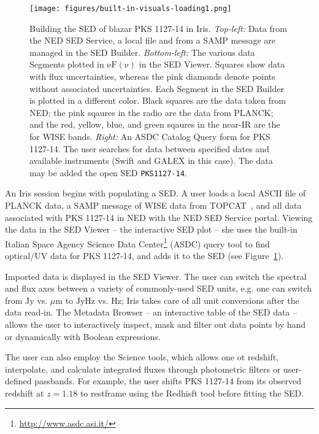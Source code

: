 \documentclass[5p]{elsarticle}
\begin{document}
\begin{figure}
\begin{center}
\texttt{[image: figures/built-in-visuals-loading1.png]}
\caption{\textbf{\textit{\label{fig:load_data}} } Building the SED of blazar PKS 1127-14 in Iris. \textit{Top-left:} Data from the NED SED Service, a local file and from a SAMP message are managed in the SED Builder. \textit{Bottom-left:} The various data Segments plotted in $\mathrm{\nu F \left( \nu \right)}$ in the SED Viewer. Squares show data with flux uncertainties, whereas the pink diamonds denote points without associated uncertainties. Each Segment in the SED Builder is plotted in a different color. Black squares are the data taken from NED; the pink sqaures in the radio are the data from PLANCK; and the red, yellow, blue, and green sqaures in the near-IR are the for WISE bands. \textit{Right:} An ASDC Catalog Query form for PKS 1127-14. The user searches for data between specified dates and available instruments (Swift and GALEX in this case). The data may be added the open SED \texttt{PKS1127-14}.}
\end{center}
\end{figure}

An Iris session begins with populating a SED. A user loads a local ASCII file of PLANCK data, a SAMP message of WISE data from TOPCAT~\citep{2005ASPC..347...29T}, and all data associated with PKS 1127-14 in NED with the NED SED Service portal. Viewing the data in the SED Viewer -- the interactive SED plot -- she uses the built-in Italian Space Agency Science Data Center\footnote{\url{http://www.asdc.asi.it/}} (ASDC) query tool to find optical/UV data for PKS 1127-14, and adds it to the SED (see Figure~\ref{fig:load_data}).

Imported data is displayed in the SED Viewer. The user can switch the spectral and flux axes between a variety of commonly-used SED units, e.g. one can switch from $\mathrm{Jy}$ vs. ${\mu}\mathrm{m}$ to $\mathrm{Jy}\mathrm{Hz}$ vs. $\mathrm{Hz}$; Iris takes care of all unit conversions after the data read-in. The Metadata Browser -- an interactive table of the SED data -- allows the user to interactively inspect, mask and filter out data points by hand or dynamically with Boolean expressions.

The user can also employ the Science tools, which allows one ot redshift, interpolate, and calculate integrated fluxes through photometric filters or user-defined passbands. For example, the user shifts PKS 1127-14 from its observed redshift at $z=1.18$ to restframe using the Redhisft tool before fitting the SED.
\end{document}
